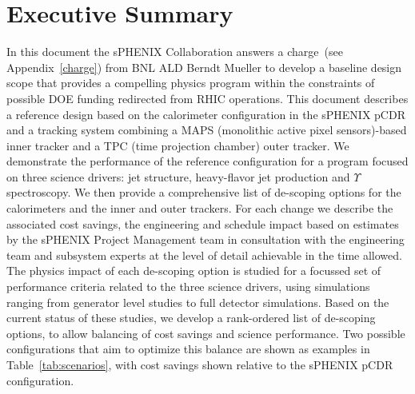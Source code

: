 \section*{Executive Summary}
\label{executive_summary}
\setcounter{page}{1}

\nocite{*}

In this document the sPHENIX Collaboration answers a charge~(see
Appendix~\ref{charge}) from BNL ALD Berndt Mueller to develop a
baseline design scope that provides a compelling physics program
within the constraints of possible DOE funding redirected from RHIC
operations. This document describes a reference design based on the
calorimeter configuration in the sPHENIX pCDR and a tracking system
combining a MAPS (monolithic active pixel sensors)-based inner tracker
and a TPC (time projection chamber) outer tracker. We demonstrate the
performance of the reference configuration for a program focused on
three science drivers: jet structure, heavy-flavor jet production and
$\Upsilon$ spectroscopy.  We then provide a comprehensive list of
de-scoping options for the calorimeters and the inner and outer
trackers. For each change we describe the associated cost savings, the
engineering and schedule impact based on estimates by the sPHENIX
Project Management team in consultation with the engineering team and
subsystem experts at the level of detail achievable in the time
allowed.  The physics impact of each de-scoping option is studied for
a focussed set of performance criteria related to the three science
drivers, using simulations ranging from generator level studies to
full detector simulations. Based on the current status of these
studies, we develop a rank-ordered list of de-scoping options, to
allow balancing of cost savings and science performance. Two possible
configurations that aim to optimize this balance are shown as examples
in Table~\ref{tab:scenarios}, with cost savings shown relative to the
sPHENIX pCDR configuration.

